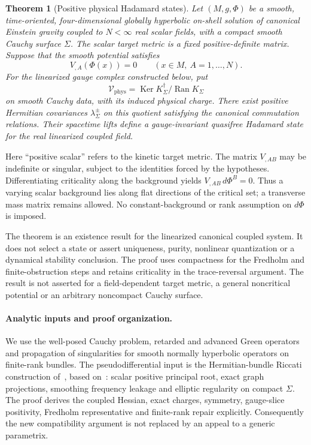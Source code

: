 \documentclass[11pt]{article}
\newtheorem{theorem}{Theorem}
\theoremstyle{definition}
\DeclareMathOperator{\Ran}{Ran}
\DeclareMathOperator{\Ker}{Ker}
\newcommand{\cV}{\mathcal V}
\begin{document}
\begin{theorem}[Positive physical Hadamard states]\label{thm:main}
Let $(M,g,\Phi)$ be a smooth, time-oriented, four-dimensional globally hyperbolic on-shell solution of canonical Einstein gravity coupled to $N<\infty$ real scalar fields, with a compact smooth Cauchy surface $\Sigma$.
The scalar target metric is a fixed positive-definite matrix.
Suppose that the smooth potential satisfies
\[
V_{,A}(\Phi(x))=0\qquad(x\in M,\ A=1,\ldots,N).
\]
For the linearized gauge complex constructed below, put
\[
\cV_{\mathrm{phys}}=\Ker K_\Sigma^\dagger/\Ran K_\Sigma
\]
on smooth Cauchy data, with its induced physical charge.
There exist positive Hermitian covariances $\lambda_\Sigma^\pm$ on this quotient satisfying the canonical commutation relations.
Their spacetime lifts define a gauge-invariant quasifree Hadamard state for the real linearized coupled field.
\end{theorem}

Here ``positive scalar'' refers to the kinetic target metric.
The matrix $V_{,AB}$ may be indefinite or singular, subject to the identities forced by the hypotheses.
Differentiating criticality along the background yields $V_{,AB}\,d\Phi^B=0$.
Thus a varying scalar background lies along flat directions of the critical set; a transverse mass matrix remains allowed.
No constant-background or rank assumption on $d\Phi$ is imposed.

The theorem is an existence result for the linearized canonical coupled system.
It does not select a state or assert uniqueness, purity, nonlinear quantization or a dynamical stability conclusion.
The proof uses compactness for the Fredholm and finite-obstruction steps and retains criticality in the trace-reversal argument.
The result is not asserted for a field-dependent target metric, a general noncritical potential or an arbitrary noncompact Cauchy surface.

\paragraph{Analytic inputs and proof organization.}
We use the well-posed Cauchy problem, retarded and advanced Green operators and propagation of singularities for smooth normally hyperbolic operators on finite-rank bundles.
The pseudodifferential input is the Hermitian-bundle Riccati construction of~\cite[Sections 3.1--3.2]{Gerard2024Compact}, based on~\cite[Section 5.2.7, Proposition 5.2]{GerardMurroWrochna2025Wick}: scalar positive principal root, exact graph projections, smoothing frequency leakage and elliptic regularity on compact $\Sigma$.
The proof derives the coupled Hessian, exact charges, symmetry, gauge-slice positivity, Fredholm representative and finite-rank repair explicitly.
Consequently the new compatibility argument is not replaced by an appeal to a generic parametrix.
\end{document}
